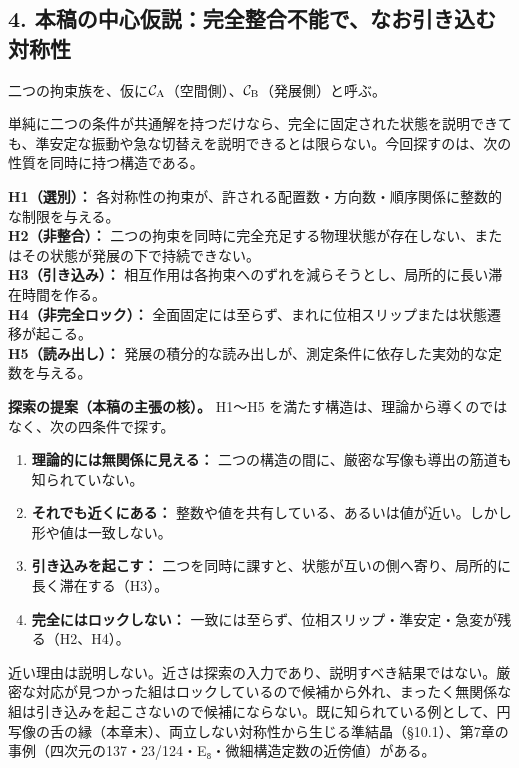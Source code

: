 \documentclass[
  a4paper,
]{ltjsarticle}
\providecommand{\tightlist}{%
  \setlength{\itemsep}{0pt}\setlength{\parskip}{0pt}}
\begin{document}
\subsection{4.
本稿の中心仮説：完全整合不能で、なお引き込む対称性}\label{ux672cux7a3fux306eux4e2dux5fc3ux4eeeux8aacux5b8cux5168ux6574ux5408ux4e0dux80fdux3067ux306aux304aux5f15ux304dux8fbcux3080ux5bfeux79f0ux6027}

二つの拘束族を、仮に\(\mathcal C_{\rm A}\)（空間側）、\(\mathcal C_{\rm B}\)（発展側）と呼ぶ。

単純に二つの条件が共通解を持つだけなら、完全に固定された状態を説明できても、準安定な振動や急な切替えを説明できるとは限らない。今回探すのは、次の性質を同時に持つ構造である。

\textbf{H1（選別）：}
各対称性の拘束が、許される配置数・方向数・順序関係に整数的な制限を与える。\\
\textbf{H2（非整合）：}
二つの拘束を同時に完全充足する物理状態が存在しない、またはその状態が発展の下で持続できない。\\
\textbf{H3（引き込み）：}
相互作用は各拘束へのずれを減らそうとし、局所的に長い滞在時間を作る。\\
\textbf{H4（非完全ロック）：}
全面固定には至らず、まれに位相スリップまたは状態遷移が起こる。\\
\textbf{H5（読み出し）：}
発展の積分的な読み出しが、測定条件に依存した実効的な定数を与える。

\textbf{探索の提案（本稿の主張の核）。} H1〜H5
を満たす構造は、理論から導くのではなく、次の四条件で探す。

\begin{enumerate}
\def\labelenumi{\arabic{enumi}.}
\tightlist
\item
  \textbf{理論的には無関係に見える：}
  二つの構造の間に、厳密な写像も導出の筋道も知られていない。
\item
  \textbf{それでも近くにある：}
  整数や値を共有している、あるいは値が近い。しかし形や値は一致しない。
\item
  \textbf{引き込みを起こす：}
  二つを同時に課すと、状態が互いの側へ寄り、局所的に長く滞在する（H3）。
\item
  \textbf{完全にはロックしない：}
  一致には至らず、位相スリップ・準安定・急変が残る（H2、H4）。
\end{enumerate}

近い理由は説明しない。近さは探索の入力であり、説明すべき結果ではない。厳密な対応が見つかった組はロックしているので候補から外れ、まったく無関係な組は引き込みを起こさないので候補にならない。既に知られている例として、円写像の舌の縁（本章末）、両立しない対称性から生じる準結晶（§10.1）、第7章の事例（四次元の137・23/124・E₈・微細構造定数の近傍値）がある。
\end{document}
